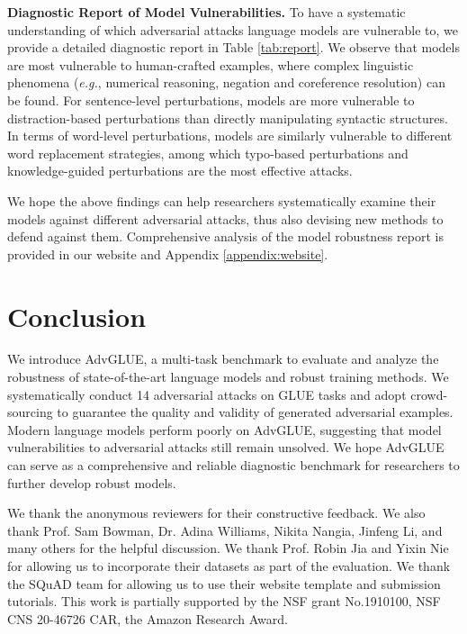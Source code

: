 \documentclass{article}
\newcommand{\method}{AdvGLUE\xspace}
\begin{document}
\textbf{Diagnostic Report of Model Vulnerabilities.}
To have a systematic understanding of which adversarial attacks language models are vulnerable to, we provide a detailed diagnostic report in Table \ref{tab:report}. 
We observe that models are most vulnerable to human-crafted examples, where complex linguistic phenomena (\emph{e.g.}, numerical reasoning, negation and coreference resolution) can be found. For sentence-level perturbations, models are more vulnerable to distraction-based perturbations than directly manipulating syntactic structures. In terms of word-level perturbations, models are similarly vulnerable to different word replacement strategies, among which typo-based perturbations and knowledge-guided perturbations are the most effective attacks.

We hope the above findings can help researchers systematically examine their models against different adversarial attacks, thus also devising new methods to defend against them. Comprehensive  analysis of the model robustness report is provided in our website and Appendix \ref{appendix:website}.



\section{Conclusion}
We introduce \method, a multi-task benchmark to evaluate and analyze the  robustness of state-of-the-art language models and robust training methods. We  systematically conduct 14  adversarial attacks on GLUE tasks and adopt crowd-sourcing to guarantee the quality and validity of generated adversarial examples. 
Modern language models perform poorly on \method, 
suggesting that model vulnerabilities to adversarial attacks still remain unsolved. We hope \method can serve as a comprehensive and reliable diagnostic benchmark for researchers to further develop  robust  models. 



\begin{ack}
We thank the anonymous reviewers for their constructive feedback.
We also thank Prof. Sam Bowman, Dr. Adina Williams, Nikita Nangia,  Jinfeng Li, and many others for the helpful discussion. We thank Prof. Robin Jia and Yixin Nie for allowing us to incorporate their datasets as part of the evaluation. We thank the SQuAD team for allowing us to use their website template and submission tutorials.
This work is partially supported by the NSF grant No.1910100, NSF CNS 20-46726 CAR, the Amazon Research Award.
\end{ack}
\end{document}
